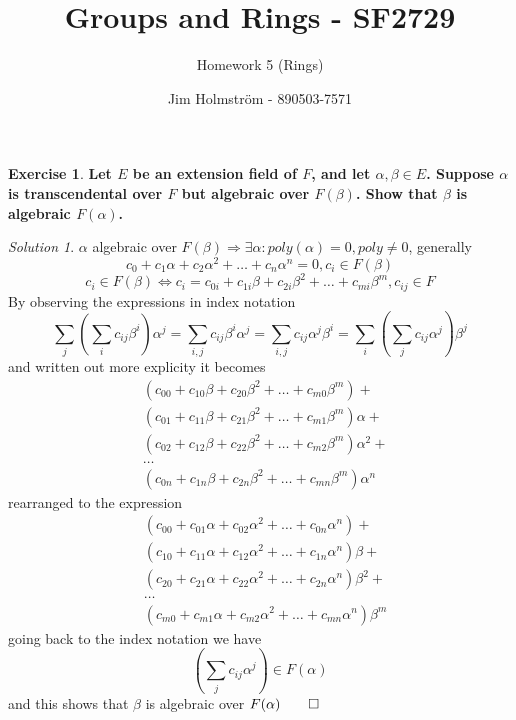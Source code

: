 \documentclass[a4paper,twoside=false,abstract=false,numbers=noenddot,
titlepage=false,headings=small,parskip=half,version=last]{scrartcl}
\author{Jim Holmström - 890503-7571}
\title{Groups and Rings - SF2729}
\subtitle{Homework 5 (Rings)}
\theoremstyle{definition}
\newtheorem{exercise}{Exercise}
\theoremstyle{remark}
\newtheorem*{solution}{Solution}
\newcommand{\poly}[4]{#1_{0#4}+#1_{1#4}{#2}+#1_{2#4}{#2}^2+\dots+#1_{#3#4}{#2}^{#3}}
\newcommand{\polymod}[4]{#1_{{#4}0}+#1_{{#4}1}{#2}+#1_{{#4}2}{#2}^2+\dots+#1_{#4#3}{#2}^{#3}}
\begin{document}
\maketitle
\thispagestyle{empty}

\begin{exercise}
{\bf
    Let $E$ be an extension field of $F$, and let $\alpha,\beta \in E$. Suppose
    $\alpha$ is transcendental over $F$ but algebraic over $F(\beta)$. Show that
    $\beta$ is algebraic $F(\alpha)$.
}
\end{exercise}
\begin{solution}
    $\alpha$ algebraic over $F(\beta) \Rightarrow \exists \alpha :
    poly(\alpha)=0,poly\neq0$, generally
    \begin{equation}
        \poly{c}{\alpha}{n}{}=0,c_i \in F(\beta)
    \end{equation}
    \begin{equation}
        c_i \in F(\beta) \Leftrightarrow c_i=\poly{c}{\beta}{m}{i},c_{ij}\in F
    \end{equation}
    By observing the expressions in index notation
    \begin{equation}
        \sum_j{\left(\sum_i{c_{ij}\beta^i}\right)\alpha^j}=
        \sum_{i,j}{c_{ij}\beta^i\alpha^j}=
        \sum_{i,j}{c_{ij}\alpha^j\beta^i}=
        \sum_i{\left(\sum_j{c_{ij}\alpha^j}\right)\beta^j}
    \end{equation}
    and written out more explicity it becomes
    \begin{equation}
        \begin{split}
            & (\poly{c}{\beta}{m}{0}) + \\
            & (\poly{c}{\beta}{m}{1})\alpha + \\
            & (\poly{c}{\beta}{m}{2})\alpha^2 + \\
            &\dots \\
            & (\poly{c}{\beta}{m}{n})\alpha^n
        \end{split}
    \end{equation}
    rearranged to the expression
    \begin{equation}
        \begin{split}
            & (\polymod{c}{\alpha}{n}{0}) + \\
            & (\polymod{c}{\alpha}{n}{1})\beta + \\
            & (\polymod{c}{\alpha}{n}{2})\beta^2 + \\
            &\dots \\
            & (\polymod{c}{\alpha}{n}{m})\beta^m
        \end{split}
    \end{equation}
    going back to the index notation we have
    \begin{equation}
        \left(\sum_j{c_{ij}\alpha^j}\right) \in F(\alpha) 
    \end{equation}
    and this shows that $\beta$ is algebraic over $F(\alpha) \qed$
    \end{solution}
\end{document}

